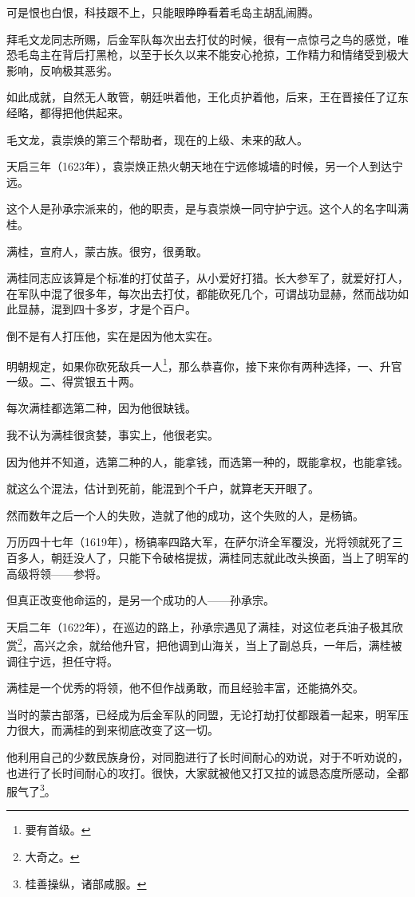 \begin{multicols}{\theparacolNo}
		可是恨也白恨，科技跟不上，只能眼睁睁看着毛岛主胡乱闹腾。

		拜毛文龙同志所赐，后金军队每次出去打仗的时候，很有一点惊弓之鸟的感觉，唯恐毛岛主在背后打黑枪，以至于长久以来不能安心抢掠，工作精力和情绪受到极大影响，反响极其恶劣。

		如此成就，自然无人敢管，朝廷哄着他，王化贞护着他，后来，王在晋接任了辽东经略，都得把他供起来。

		毛文龙，袁崇焕的第三个帮助者，现在的上级、未来的敌人。

		天启三年（1623年），袁崇焕正热火朝天地在宁远修城墙的时候，另一个人到达宁远。

		这个人是孙承宗派来的，他的职责，是与袁崇焕一同守护宁远。这个人的名字叫满桂。

		满桂，宣府人，蒙古族。很穷，很勇敢。

		满桂同志应该算是个标准的打仗苗子，从小爱好打猎。长大参军了，就爱好打人，在军队中混了很多年，每次出去打仗，都能砍死几个，可谓战功显赫，然而战功如此显赫，混到四十多岁，才是个百户。

		倒不是有人打压他，实在是因为他太实在。

		明朝规定，如果你砍死敌兵一人\footnote{要有首级。}，那么恭喜你，接下来你有两种选择，一、升官一级。二、得赏银五十两。

		每次满桂都选第二种，因为他很缺钱。

		我不认为满桂很贪婪，事实上，他很老实。

		因为他并不知道，选第二种的人，能拿钱，而选第一种的，既能拿权，也能拿钱。

		就这么个混法，估计到死前，能混到个千户，就算老天开眼了。

		然而数年之后一个人的失败，造就了他的成功，这个失败的人，是杨镐。

		万历四十七年（1619年），杨镐率四路大军，在萨尔浒全军覆没，光将领就死了三百多人，朝廷没人了，只能下令破格提拔，满桂同志就此改头换面，当上了明军的高级将领——参将。

		但真正改变他命运的，是另一个成功的人——孙承宗。

		天启二年（1622年），在巡边的路上，孙承宗遇见了满桂，对这位老兵油子极其欣赏\footnote{大奇之。}，高兴之余，就给他升官，把他调到山海关，当上了副总兵，一年后，满桂被调往宁远，担任守将。

		满桂是一个优秀的将领，他不但作战勇敢，而且经验丰富，还能搞外交。

		当时的蒙古部落，已经成为后金军队的同盟，无论打劫打仗都跟着一起来，明军压力很大，而满桂的到来彻底改变了这一切。

		他利用自己的少数民族身份，对同胞进行了长时间耐心的劝说，对于不听劝说的，也进行了长时间耐心的攻打。很快，大家就被他又打又拉的诚恳态度所感动，全都服气了\footnote{桂善操纵，诸部咸服。}。


\end{multicols}
